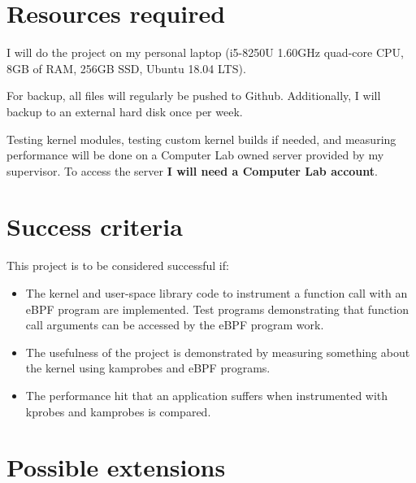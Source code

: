 \section*{Resources required}

    I will do the project on my personal laptop (i5-8250U 1.60GHz quad-core CPU, 8GB of RAM, 256GB SSD, Ubuntu 18.04 LTS).
    
    For backup, all files will regularly be pushed to Github. Additionally, I will backup to an external hard disk
    once per week.

    Testing kernel modules, testing custom kernel builds if needed, and measuring performance will be done on 
    a Computer Lab owned server provided by my supervisor. To access the server {\bf I will need a Computer Lab account}.

\section*{Success criteria}

    This project is to be considered successful if:
    \begin{itemize}
        \item The kernel and user-space library code to instrument a function call with an eBPF program are implemented.
        Test programs demonstrating that function call arguments can be accessed by the eBPF program work.

        \item The usefulness of the project is demonstrated by measuring something about the kernel using 
        kamprobes and eBPF programs.

        \item The performance hit that an application suffers when instrumented with kprobes and kamprobes is 
        compared.

    \end{itemize}

\section*{Possible extensions}

